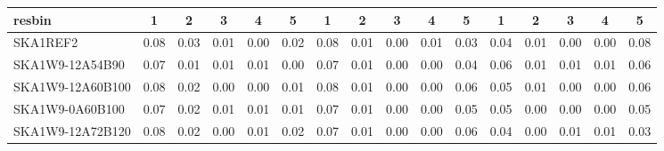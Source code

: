 \begin{table}[H]
{{\begin{tabular}{|lccccc||ccccc||ccccc|}
 resbin  &1 & 2 & 3 & 4 & 5 & 1 & 2 & 3 & 4 & 5 & 1 & 2 & 3 & 4 & 5 \\ \hline
SKA1REF2 & 0.08 \cellcolor{blue!60.00} & 0.03 \cellcolor{red!60.00} & 0.01 \cellcolor{green!60.00} & 0.00 \cellcolor{orange!18.00} & 0.02 \cellcolor{purple!60.00} & 0.08 \cellcolor{blue!60.00} & 0.01 \cellcolor{red!60.00} & 0.00 \cellcolor{green!18.00} & 0.01 \cellcolor{orange!60.00} & 0.03 \cellcolor{purple!18.00} & 0.04 \cellcolor{blue!18.00} & 0.01 \cellcolor{red!60.00} & 0.00 \cellcolor{green!18.00} & 0.00 \cellcolor{orange!18.00} & 0.08 \cellcolor{purple!60.00}\\ \hline 
SKA1W9-12A54B90 & 0.07 \cellcolor{blue!18.00} & 0.01 \cellcolor{red!18.00} & 0.01 \cellcolor{green!60.00} & 0.01 \cellcolor{orange!60.00} & 0.00 \cellcolor{purple!18.00} & 0.07 \cellcolor{blue!39.00} & 0.01 \cellcolor{red!60.00} & 0.00 \cellcolor{green!18.00} & 0.00 \cellcolor{orange!18.00} & 0.04 \cellcolor{purple!32.00} & 0.06 \cellcolor{blue!60.00} & 0.01 \cellcolor{red!60.00} & 0.01 \cellcolor{green!60.00} & 0.01 \cellcolor{orange!60.00} & 0.06 \cellcolor{purple!43.20}\\ \hline 
SKA1W9-12A60B100 & 0.08 \cellcolor{blue!60.00} & 0.02 \cellcolor{red!39.00} & 0.00 \cellcolor{green!18.00} & 0.00 \cellcolor{orange!18.00} & 0.01 \cellcolor{purple!39.00} & 0.08 \cellcolor{blue!60.00} & 0.01 \cellcolor{red!60.00} & 0.00 \cellcolor{green!18.00} & 0.00 \cellcolor{orange!18.00} & 0.06 \cellcolor{purple!60.00} & 0.05 \cellcolor{blue!39.00} & 0.01 \cellcolor{red!60.00} & 0.00 \cellcolor{green!18.00} & 0.00 \cellcolor{orange!18.00} & 0.06 \cellcolor{purple!43.20}\\ \hline 
SKA1W9-0A60B100 & 0.07 \cellcolor{blue!18.00} & 0.02 \cellcolor{red!39.00} & 0.01 \cellcolor{green!60.00} & 0.01 \cellcolor{orange!60.00} & 0.01 \cellcolor{purple!39.00} & 0.07 \cellcolor{blue!39.00} & 0.01 \cellcolor{red!60.00} & 0.00 \cellcolor{green!18.00} & 0.00 \cellcolor{orange!18.00} & 0.05 \cellcolor{purple!46.00} & 0.05 \cellcolor{blue!39.00} & 0.00 \cellcolor{red!18.00} & 0.00 \cellcolor{green!18.00} & 0.00 \cellcolor{orange!18.00} & 0.05 \cellcolor{purple!34.80}\\ \hline 
SKA1W9-12A72B120 & 0.08 \cellcolor{blue!60.00} & 0.02 \cellcolor{red!39.00} & 0.00 \cellcolor{green!18.00} & 0.01 \cellcolor{orange!60.00} & 0.02 \cellcolor{purple!60.00} & 0.07 \cellcolor{blue!39.00} & 0.01 \cellcolor{red!60.00} & 0.00 \cellcolor{green!18.00} & 0.00 \cellcolor{orange!18.00} & 0.06 \cellcolor{purple!60.00} & 0.04 \cellcolor{blue!18.00} & 0.00 \cellcolor{red!18.00} & 0.01 \cellcolor{green!60.00} & 0.01 \cellcolor{orange!60.00} & 0.03 \cellcolor{purple!18.00}\\ \hline 

\end{tabular}}}
\end{table}
